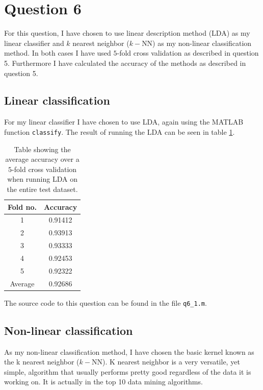 \documentclass[10pt]{article}
\begin{document}

\section*{Question 6} %
\label{sec:question_6}

For this question, I have chosen to use linear description method (LDA) as my linear classifier and $k$ nearest neighbor ($k-$NN) as my non-linear classification method. In both cases I have used $5$-fold cross validation as described in question 5. Furthermore I have calculated the accuracy of the methods as described in question 5.  

\subsection*{Linear classification} %
\label{sub:linear_classification2}

For my linear classifier I have chosen to use LDA, again using the MATLAB function \texttt{classify}. The result of running the LDA can be seen in table \ref{table3}.

\begin{table}
  \begin{center}  
    \begin{tabular}{ | c | c |}
      \hline
      Fold no. & Accuracy\\
      \hline
      1    &     0.91412\\
      2    &     0.93913\\
      3    &     0.93333\\
      4    &     0.92453\\
      5    &     0.92322\\
      \hline
      Average &  0.92686 \\
      \hline
    \end{tabular}
    \caption{Table showing the average accuracy over a $5$-fold cross validation when running LDA on the entire test dataset.}
    \label{table3}
  \end{center}    
\end{table}   

The source code to this question can be found in the file \texttt{q6\_1.m}.



\subsection*{Non-linear classification} %
\label{sub:non_linear_classification2}
As my non-linear classification method, I have chosen the basic kernel known as the k nearest neighbor ($k-$NN). K nearest neighbor is a very versatile, yet simple, algorithm that usually performs pretty good regardless of the data it is working on. It is actually in the top 10 data mining algorithms\cite{Wu07doi10.1007/s10115-007-0114-2}.
\end{document}
